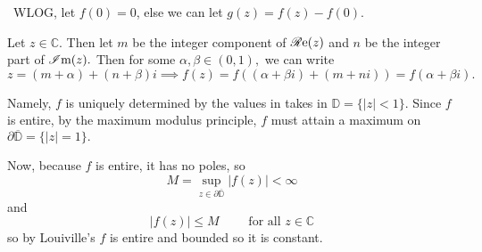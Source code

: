 \documentclass[12pt]{Qual}
\begin{document}
\begin{solution}$\,$
WLOG, let $f(0)=0$, else we can let $g(z)=f(z)-f(0)$.

Let $z\in\mathbb{C}$. Then let $m$ be the integer component of $\mathscr{R}\text{e}(z)$ and $n$ be the integer part of $\mathscr{I}\text{m}(z).$ Then for some $\alpha,\beta\in(0,1),$ we can write $$z=(m+\alpha)+(n+\beta)i\implies f(z)=f((\alpha+\beta i)+(m+ni))=f(\alpha+\beta i).$$

Namely, $f$ is uniquely determined by the values in takes in $\mathbb{D}=\{|z|<1\}$. Since $f$ is entire, by the maximum modulus principle, $f$ must attain a maximum on $\partial\overline{\mathbb{D}}=\{|z|=1\}.$

Now, because $f$ is entire, it has no poles, so $$M=\sup_{z\in\partial\overline{\mathbb{D}}}|f(z)|<\infty$$ and $$|f(z)|\le M\qquad\text{ for all }z\in\mathbb{C}$$ so by Louiville's $f$ is entire and bounded so it is constant.
\end{solution}
\end{document}
